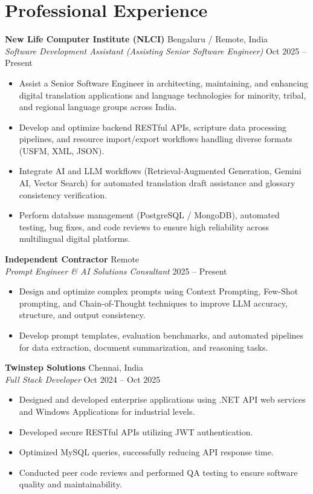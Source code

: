 \documentclass[10pt, letterpaper]{article}
\begin{document}
\section*{Professional Experience}

\textbf{New Life Computer Institute (NLCI)} \hfill Bengaluru / Remote, India \\
\textit{Software Development Assistant (Assisting Senior Software Engineer)} \hfill Oct 2025 -- Present
\begin{itemize}[leftmargin=0.25in, itemsep=0pt, parsep=0pt, topsep=2pt]
    \item Assist a Senior Software Engineer in architecting, maintaining, and enhancing digital translation applications and language technologies for minority, tribal, and regional language groups across India.
    \item Develop and optimize backend RESTful APIs, scripture data processing pipelines, and resource import/export workflows handling diverse formats (USFM, XML, JSON).
    \item Integrate AI and LLM workflows (Retrieval-Augmented Generation, Gemini AI, Vector Search) for automated translation draft assistance and glossary consistency verification.
    \item Perform database management (PostgreSQL / MongoDB), automated testing, bug fixes, and code reviews to ensure high reliability across multilingual digital platforms.
\end{itemize}

\textbf{Independent Contractor} \hfill Remote \\
\textit{Prompt Engineer \& AI Solutions Consultant} \hfill 2025 -- Present
\begin{itemize}[leftmargin=0.25in, itemsep=0pt, parsep=0pt, topsep=2pt]
    \item Design and optimize complex prompts using Context Prompting, Few-Shot prompting, and Chain-of-Thought techniques to improve LLM accuracy, structure, and output consistency.
    \item Develop prompt templates, evaluation benchmarks, and automated pipelines for data extraction, document summarization, and reasoning tasks.
\end{itemize}

\textbf{Twinstep Solutions} \hfill Chennai, India \\
\textit{Full Stack Developer} \hfill Oct 2024 -- Oct 2025
\begin{itemize}[leftmargin=0.25in, itemsep=0pt, parsep=0pt, topsep=2pt]
    \item Designed and developed enterprise applications using .NET API web services and Windows Applications for industrial levels.
    \item Developed secure RESTful APIs utilizing JWT authentication.
    \item Optimized MySQL queries, successfully reducing API response time.
    \item Conducted peer code reviews and performed QA testing to ensure software quality and maintainability.
\end{itemize}
\end{document}
